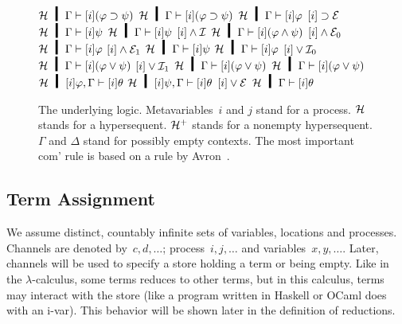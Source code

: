 {\begin{figure}
  {$\hyper\hmid\Gamma\vdash [i](\varphi\supset \psi)$}
  \hfill
  \BinaryRule
  {$\hyper\hmid\Gamma\vdash [i](\varphi\supset\psi)$}
  {$\hyper\hmid\Gamma\vdash [i]\varphi$}
  {$[i]\supset\mathcal E$}
  {$\hyper\hmid\Gamma\vdash [i]\psi$}
   \vskip 2mm
  \BinaryRule{$\hyper\hmid\Gamma\vdash [i]\varphi$}
   {$\hyper\hmid\Gamma\vdash [i]\psi$}
   {$[i]\wedge\mathcal I$}
   {$\hyper\hmid\Gamma\vdash [i](\varphi\wedge\psi)$}
   \vskip 2mm
  \UnaryRule{$\hyper\hmid\Gamma\vdash [i](\varphi\wedge\psi)$}
   {$[i]\wedge\mathcal E_0$}
   {$\hyper\hmid\Gamma\vdash[i]\varphi$}
   \hfill
  \UnaryRule{$\hyper\hmid\Gamma\vdash[i](\varphi\wedge\psi)$}
   {$[i]\wedge\mathcal E_1$}
   {$\hyper\hmid\Gamma\vdash[i]\psi$}
\vskip 2mm
  \UnaryRule
   {$\hyper\hmid\Gamma\vdash[i]\varphi$}
   {$[i]\vee\mathcal I_0$}
   {$\hyper\hmid\Gamma\vdash[i](\varphi\vee\psi)$}
   \hfill
  \UnaryRule{$\hyper\hmid\Gamma\vdash[i]\psi$}
   {$[i]\vee\mathcal I_1$}
   {$\hyper\hmid\Gamma\vdash[i](\varphi\vee\psi)$}
\vskip 2mm
   \TrinaryRule
   {$\hyper\hmid\Gamma\vdash[i](\varphi\vee\psi)$}
   {$\hyper\hmid[i]\varphi, \Gamma\vdash[i]\theta$}
   {$\hyper\hmid[i]\psi,    \Gamma\vdash[i]\theta$}
   {$[i]\vee\mathcal E$}
   {$\hyper\hmid         \Gamma\vdash[i]\theta$}
\vskip 2mm
\caption[The underlying logic .]
 {The underlying logic.
 Metavariables~$i$ and $j$ stand for a process.
 $\mathcal{H}$ stands for a
 hypersequent.
 $\mathcal{H}^+$ stands for a nonempty hypersequent.
 $\Gamma$ and $\Delta$ stand for possibly empty contexts.
 The most important com' rule is based on a rule by
 Avron~\cite{avron96}.
 }
\label{fig:logic}
\end{figure}

\subsection{Term Assignment}
\label{term}

We assume distinct, countably infinite sets of variables,
locations
and
processes.
Channels are denoted by~$c,d,\ldots$; process~$i,j, \ldots$ and variables~$x,
y, \ldots$.
Later, channels will be used to specify a store
holding a term or being empty.
Like in the $\lambda$-calculus, some terms reduces to other
terms, but in this calculus, terms may interact with the store (like
a program written in Haskell or OCaml does with an i-var).
This behavior will be shown later in the definition of reductions.

}
